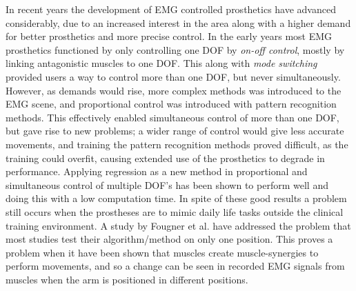




In recent years the development of EMG controlled prosthetics have advanced considerably, due to an increased interest in the area along with a higher demand for better prosthetics and more precise control. \cite{Fougner2012} In the early years most EMG prosthetics functioned by only controlling one DOF by \textit{on-off control}, mostly by linking antagonistic muscles to one DOF. This along with \textit{mode switching} provided users a way to control more than one DOF, but never simultaneously. However, as demands would rise, more complex methods was introduced to the EMG scene, and proportional control was introduced with pattern recognition methods. This effectively enabled simultaneous control of more than one DOF, but gave rise to new problems; a wider range of control would give less accurate movements, and training the pattern recognition methods proved difficult, as the training could overfit, causing extended use of the prosthetics to degrade in performance. \cite{Ison2016} 
Applying regression as a new method in proportional and simultaneous control of multiple DOF's has been shown to perform well and doing this with a low computation time. \cite{hahne2014} In spite of these good results a problem still occurs when the prostheses are to mimic daily life tasks outside the clinical training environment.  
A study by Fougner et al. \cite{Fougner2011} have addressed the problem that most studies test their algorithm/method on only one position.
This proves a problem when it have been shown that muscles create muscle-synergies to perform movements, and so a change can be seen in recorded EMG signals from muscles when the arm is positioned in different positions. \cite{avella2006, DeRugy2013, Fougner2011} 
